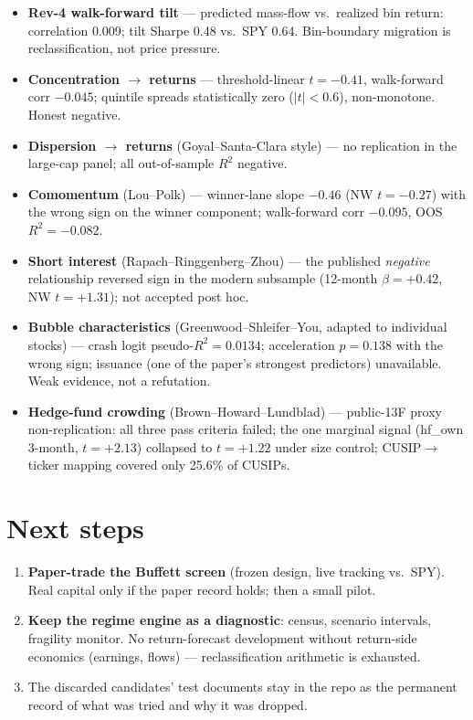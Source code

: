 \documentclass[11pt,a4paper]{article}
\begin{document}
\begin{itemize}
\item \textbf{Rev-4 walk-forward tilt} --- predicted mass-flow vs.\ realized bin return: correlation 0.009; tilt Sharpe 0.48 vs.\ SPY 0.64. Bin-boundary migration is reclassification, not price pressure.
\item \textbf{Concentration $\to$ returns} --- threshold-linear $t=-0.41$, walk-forward corr $-0.045$; quintile spreads statistically zero ($|t|<0.6$), non-monotone. Honest negative.
\item \textbf{Dispersion $\to$ returns} (Goyal--Santa-Clara style) --- no replication in the large-cap panel; all out-of-sample $R^2$ negative.
\item \textbf{Comomentum} (Lou--Polk) --- winner-lane slope $-0.46$ (NW $t=-0.27$) with the wrong sign on the winner component; walk-forward corr $-0.095$, OOS $R^2=-0.082$.
\item \textbf{Short interest} (Rapach--Ringgenberg--Zhou) --- the published \emph{negative} relationship reversed sign in the modern subsample (12-month $\beta=+0.42$, NW $t=+1.31$); not accepted post hoc.
\item \textbf{Bubble characteristics} (Greenwood--Shleifer--You, adapted to individual stocks) --- crash logit pseudo-$R^2=0.0134$; acceleration $p=0.138$ with the wrong sign; issuance (one of the paper's strongest predictors) unavailable. Weak evidence, not a refutation.
\item \textbf{Hedge-fund crowding} (Brown--Howard--Lundblad) --- public-13F proxy non-replication: all three pass criteria failed; the one marginal signal (hf\_own 3-month, $t=+2.13$) collapsed to $t=+1.22$ under size control; CUSIP$\to$ticker mapping covered only 25.6\% of CUSIPs.
\end{itemize}

\section{Next steps}

\begin{enumerate}
\item \textbf{Paper-trade the Buffett screen} (frozen design, live tracking vs.\ SPY). Real capital only if the paper record holds; then a small pilot.
\item \textbf{Keep the regime engine as a diagnostic}: census, scenario intervals, fragility monitor. No return-forecast development without return-side economics (earnings, flows) --- reclassification arithmetic is exhausted.
\item The discarded candidates' test documents stay in the repo as the permanent record of what was tried and why it was dropped.
\end{enumerate}
\end{document}
